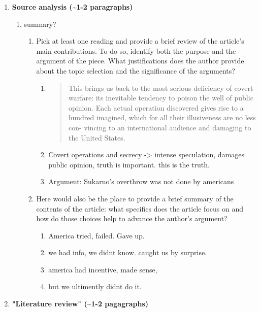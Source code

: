 \documentclass[letterpaper]{article}
\begin{document}
\begin{enumerate}
\item \textbf{Source analysis (\textasciitilde{}1-2 paragraphs)}

\begin{enumerate}
\item summary?

\begin{enumerate}
\item Pick at least one reading and provide a brief review of the
article's main contributions. To do so, identify both the
purpose and the argument of the piece. What justifications does
the author provide about the topic selection and the
significance of the arguments?

\begin{enumerate}
\item \begin{quote}
This brings us back to the most serious deficiency of
covert warfare: its inevitable tendency to poison the well
of public opinion. Each actual operation discovered gives
rise to a hundred imagined, which for all their
illusiveness are no less con- vincing to an international
audience and damaging to the United States.
\end{quote}

\item Covert operations and secrecy -> intense speculation,
damages public opinion, truth is important. this is the
truth.

\item Argument: Sukarno's overthrow was not done by americans
\end{enumerate}

\item Here would also be the place to provide a brief summary of the
contents of the article: what specifics does the article focus
on and how do those choices help to advance the author's
argument?

\begin{enumerate}
\item America tried, failed. Gave up.
\item we had info, we didnt know. caught us by surprise.
\item america had incentive, made sense,
\item but we ultimently didnt do it.
\end{enumerate}
\end{enumerate}
\end{enumerate}

\item \textbf{"Literature review" (\textasciitilde{}1-2 pagagraphs)}


\end{enumerate}
\end{document}
